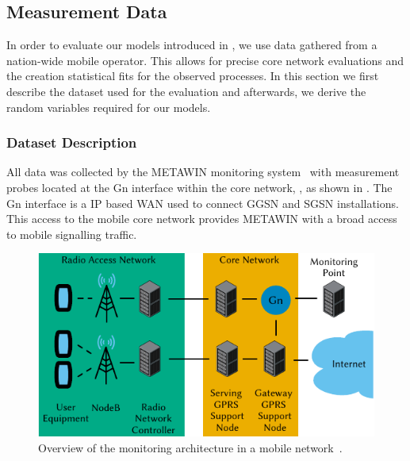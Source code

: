 \subsection{Measurement Data}\label{sec:cloud:virtualized_network_functions:measurement_data}

In order to evaluate our models introduced in , we use data gathered from a nation-wide mobile operator.
This allows for precise core network evaluations and the creation statistical fits for the observed processes.
In this section we first describe the dataset used for the evaluation and afterwards, we derive the random variables required for our models.

\subsubsection*{Dataset Description}\label{sec:cloud:virtualized_network_functions:measurement_data:description}

\label{sec:dataset_description}

All data was collected by the \gls{METAWIN} monitoring system~\cite{Ricciato2006} with measurement probes located at the Gn interface within the core network, , as shown in .
The Gn interface is a \gls{IP} based \gls{WAN} used to connect \gls{GGSN} and \gls{SGSN} installations.
This access to the mobile core network provides \gls{METAWIN} with a broad access to mobile signalling traffic.

\begin{figure}
  \centering
  \includegraphics{cloud/virtualized_network_functions/measurement_data/figures/mobile_network_overview}
  \caption{Overview of the  monitoring architecture in a  mobile network~\cite{Ricciato2006}.}
  \label{fig:cloud:virtualized_network_functions:measurement_data:dataset_description:mobile_network_overview}
\end{figure}

